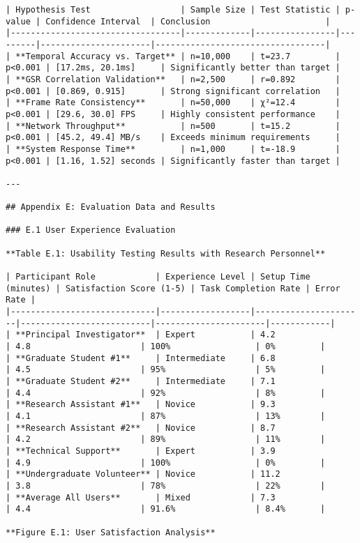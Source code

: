 \documentclass[11pt,a4paper]{report}
\begin{document}
\begin{verbatim}
| Hypothesis Test                  | Sample Size | Test Statistic | p-value | Confidence Interval  | Conclusion                       |
|----------------------------------|-------------|----------------|---------|----------------------|----------------------------------|
| **Temporal Accuracy vs. Target** | n=10,000    | t=23.7         | p<0.001 | [17.2ms, 20.1ms]     | Significantly better than target |
| **GSR Correlation Validation**   | n=2,500     | r=0.892        | p<0.001 | [0.869, 0.915]       | Strong significant correlation   |
| **Frame Rate Consistency**       | n=50,000    | χ²=12.4        | p<0.001 | [29.6, 30.0] FPS     | Highly consistent performance    |
| **Network Throughput**           | n=500       | t=15.2         | p<0.001 | [45.2, 49.4] MB/s    | Exceeds minimum requirements     |
| **System Response Time**         | n=1,000     | t=-18.9        | p<0.001 | [1.16, 1.52] seconds | Significantly faster than target |

---

## Appendix E: Evaluation Data and Results

### E.1 User Experience Evaluation

**Table E.1: Usability Testing Results with Research Personnel**

| Participant Role            | Experience Level | Setup Time (minutes) | Satisfaction Score (1-5) | Task Completion Rate | Error Rate |
|-----------------------------|------------------|----------------------|--------------------------|----------------------|------------|
| **Principal Investigator**  | Expert           | 4.2                  | 4.8                      | 100%                 | 0%         |
| **Graduate Student #1**     | Intermediate     | 6.8                  | 4.5                      | 95%                  | 5%         |
| **Graduate Student #2**     | Intermediate     | 7.1                  | 4.4                      | 92%                  | 8%         |
| **Research Assistant #1**   | Novice           | 9.3                  | 4.1                      | 87%                  | 13%        |
| **Research Assistant #2**   | Novice           | 8.7                  | 4.2                      | 89%                  | 11%        |
| **Technical Support**       | Expert           | 3.9                  | 4.9                      | 100%                 | 0%         |
| **Undergraduate Volunteer** | Novice           | 11.2                 | 3.8                      | 78%                  | 22%        |
| **Average All Users**       | Mixed            | 7.3                  | 4.4                      | 91.6%                | 8.4%       |

**Figure E.1: User Satisfaction Analysis**

\end{verbatim}
\end{document}
